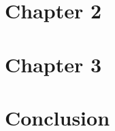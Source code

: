 \documentclass[11pt,openright,oneside,letterpaper,onecolumn]{report}  %
\begin{document}
\chapter{Chapter 2} 
\label{chapter2}


\chapter{Chapter 3}
\label{chapter3}


\chapter{Conclusion}
\label{conclusion}


%


 
\end{document}
